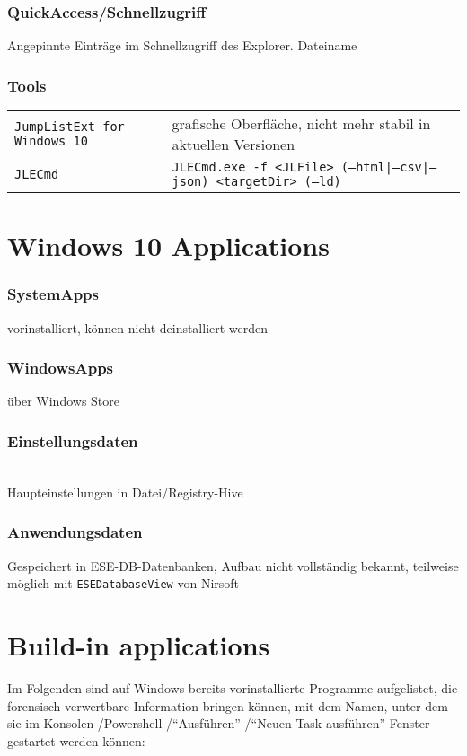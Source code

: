 \begin{multicols}{3}
\subsubsection{QuickAccess/Schnellzugriff}
Angepinnte Einträge im Schnellzugriff des Explorer. Dateiname 

\subsubsection{Tools}
\begin{tabular}{@{}p{\the\MyLen}%
		@{}p{\linewidth-\the\MyLen}@{}}
	\texttt{JumpListExt for Windows 10} & grafische Oberfläche, nicht mehr stabil in aktuellen Versionen\\
	\texttt{JLECmd} & \texttt{JLECmd.exe -f <JLFile> (--html|--csv|--json) <targetDir> (--ld)}\\
\end{tabular}

\section{Windows 10 Applications}
\subsubsection{SystemApps}
vorinstalliert, können nicht deinstalliert werden\\
\subsubsection{WindowsApps}
über Windows Store
\subsubsection{Einstellungsdaten}
\\
Haupteinstellungen in Datei/Registry-Hive 
\subsubsection{Anwendungsdaten}
Gespeichert in ESE-DB-Datenbanken, Aufbau nicht vollständig bekannt, teilweise möglich mit \texttt{ESEDatabaseView} von Nirsoft

\section{Build-in applications}
Im Folgenden sind auf Windows bereits vorinstallierte Programme aufgelistet, die forensisch verwertbare Information bringen können, mit dem Namen, unter dem sie im Konsolen-/Powershell-/\enquote{Ausführen}-/\enquote{Neuen Task ausführen}-Fenster gestartet werden können:


\end{multicols}
